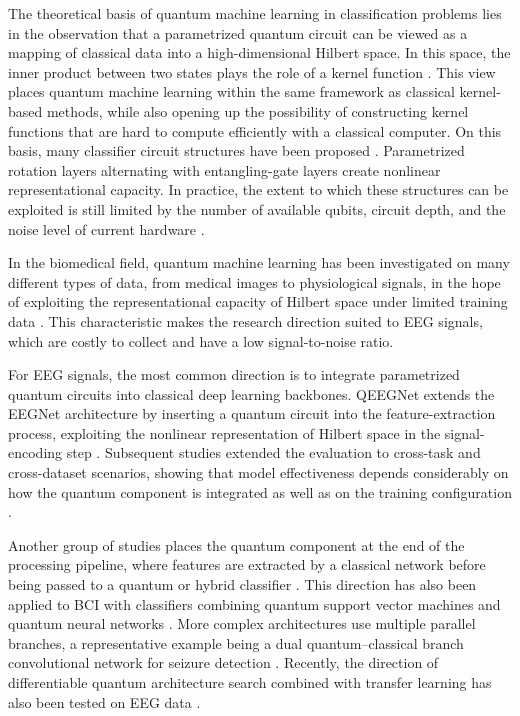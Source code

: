 The theoretical basis of quantum machine learning in classification
problems lies in the observation that a parametrized quantum circuit
can be viewed as a mapping of classical data into a high-dimensional
Hilbert space. In this space, the inner product between two states
plays the role of a kernel function \cite{schuld2019quantum}. This
view places quantum machine learning within the same framework as
classical kernel-based methods, while also opening up the
possibility of constructing kernel functions that are hard to
compute efficiently with a classical computer. On this basis, many
classifier circuit structures have been proposed
\cite{schuld2020circuitcentric}. Parametrized rotation layers
alternating with entangling-gate layers create nonlinear
representational capacity. In practice, the extent to which these
structures can be exploited is still limited by the number of
available qubits, circuit depth, and the noise level of current
hardware \cite{xie2025advances}.

In the biomedical field, quantum machine learning has been
investigated on many different types of data, from medical images to
physiological signals, in the hope of exploiting the representational
capacity of Hilbert space under limited training data
\cite{idzikowski2026survey}. This characteristic makes the research
direction suited to EEG signals, which are costly to collect and have
a low signal-to-noise ratio.

For EEG signals, the most common direction is to integrate
parametrized quantum circuits into classical deep learning backbones.
QEEGNet extends the EEGNet architecture \cite{lawhern2018eegnet} by
inserting a quantum circuit into the feature-extraction process,
exploiting the nonlinear representation of Hilbert space in the
signal-encoding step \cite{chen2024qeegnet}. Subsequent studies
extended the evaluation to cross-task and cross-dataset scenarios,
showing that model effectiveness depends considerably on how the
quantum component is integrated as well as on the training
configuration \cite{chen2026exploring}.

Another group of studies places the quantum component at the end of
the processing pipeline, where features are extracted by a classical
network before being passed to a quantum or hybrid classifier
\cite{olvera2024eegbased}. This direction has also been applied to
BCI with classifiers combining quantum support vector machines and
quantum neural networks \cite{behera2026qsvmqnn}. More complex
architectures use multiple parallel branches, a representative
example being a dual quantum--classical branch convolutional network
for seizure detection \cite{dutta2026duoqepinet}. Recently, the
direction of differentiable quantum architecture search combined with
transfer learning has also been tested on EEG data
\cite{park2026qdiver}.

